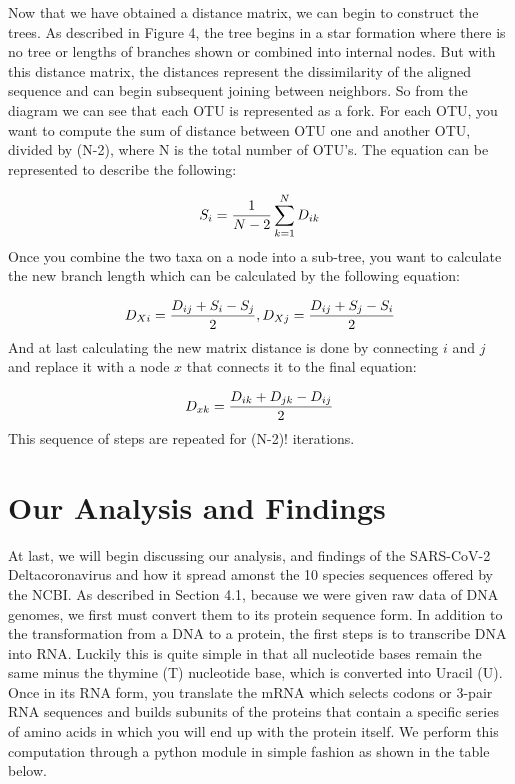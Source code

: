 Now that we have obtained a distance matrix, we can begin to construct the trees. As described in Figure 4, the tree begins in a star formation where there is no tree or lengths of branches shown or combined into internal nodes. But with this distance matrix, the distances represent the dissimilarity of the aligned sequence and can begin subsequent joining between neighbors. So from the diagram we can see that each OTU is represented as a fork. For each OTU, you want to compute the sum of distance between OTU one and another OTU, divided by (N-2), where N is the total number of OTU's. The equation can be represented to describe the following: 

\begin{equation}
\label{computation}
S_i=\frac{1}{N-2}\sum_{k=1}^{N} D_{ik}\\
\end{equation}
Once you combine the two taxa on a node into a sub-tree, you want to calculate the new branch length which can be calculated by the following equation:

\begin{equation}
\label{branch-length}
D_{Xi} = \frac{D_{ij}+S_i-S_j}{2}, D_{Xj} = \frac{D_{ij}+S_j-S_i}{2}\\
\end{equation}
And at last calculating the new matrix distance is done by connecting $i$ and $j$ and replace it with a node $x$ that connects it to the final equation:

\begin{equation}
\label{branch-length}
D_{xk}=\frac{D_{ik}+D_{jk}-D_{ij}}{2}\\
\end{equation}
This sequence of steps are repeated for (N-2)! iterations.


\section{Our Analysis and Findings}

At last, we will begin discussing our analysis, and findings of the SARS-CoV-2 Deltacoronavirus and how it spread amonst the 10 species sequences offered by the NCBI. As described in Section 4.1, because we were given raw data of DNA genomes, we first must convert them to its protein sequence form. In addition to the transformation from a DNA to a protein, the first steps is to transcribe DNA into RNA. Luckily this is quite simple in that all nucleotide bases remain the same minus the thymine (T) nucleotide base, which is converted into Uracil (U). Once in its RNA form, you translate the mRNA which selects codons or 3-pair RNA sequences and builds subunits of the proteins that contain a specific series of amino acids in which you will end up with the protein itself. We perform this computation through a python module in simple fashion as shown in the table below.

